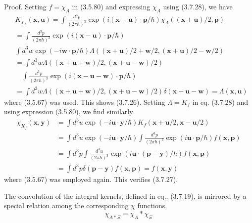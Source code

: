 \documentclass{article}
\begin{document}
Proof. Setting $f=\chi_{A}$ in (3.5.80) and expressing $\chi_{A}$ using (3.7.28), we have
$$
\begin{align*}
& K_{\chi_{\Lambda}}(\boldsymbol{x}, \boldsymbol{u})= \int \frac{d^{3} p}{(2 \pi \hbar)^{3}} \exp (i(\boldsymbol{x}-\boldsymbol{u}) \cdot \boldsymbol{p} / \hbar) \chi_{\Lambda}((\boldsymbol{x}+\boldsymbol{u}) / 2, \boldsymbol{p})  \tag{3.7.29}\\
&= \int \frac{d^{3} p}{(2 \pi \hbar)^{3}} \exp (i(\boldsymbol{x}-\boldsymbol{u}) \cdot \boldsymbol{p} / \hbar) \\
& \int d^{3} w \exp (-i \boldsymbol{w} \cdot \boldsymbol{p} / \hbar) \Lambda((\boldsymbol{x}+\boldsymbol{u}) / 2+\boldsymbol{w} / 2,(\boldsymbol{x}+\boldsymbol{u}) / 2-\boldsymbol{w} / 2) \\
&= \int d^{3} w \Lambda((\boldsymbol{x}+\boldsymbol{u}+\boldsymbol{w}) / 2,(\boldsymbol{x}+\boldsymbol{u}-\boldsymbol{w}) / 2) \\
& \quad \int \frac{d^{3} p}{(2 \pi \hbar)^{3}} \exp (i(\boldsymbol{x}-\boldsymbol{u}-\boldsymbol{w}) \cdot \boldsymbol{p} / \hbar) \\
&= \int d^{3} w \Lambda((\boldsymbol{x}+\boldsymbol{u}+\boldsymbol{w}) / 2,(\boldsymbol{x}+\boldsymbol{u}-\boldsymbol{w}) / 2) \delta(\boldsymbol{x}-\boldsymbol{u}-\boldsymbol{w})=\Lambda(\boldsymbol{x}, \boldsymbol{u})
\end{align*}
$$
where (3.5.67) was used. This shows (3.7.26).
Setting $\Lambda=K_{f}$ in eq. (3.7.28) and using expression (3.5.80), we find similarly
$$
\begin{align*}
\chi_{K_{f}}(\boldsymbol{x}, \boldsymbol{y}) & =\int d^{3} u \exp (-i \boldsymbol{u} \cdot \boldsymbol{y} / \hbar) K_{f}(\boldsymbol{x}+\boldsymbol{u} / 2, \boldsymbol{x}-\boldsymbol{u} / 2)  \tag{3.7.30}\\
& =\int d^{3} u \exp (-i \boldsymbol{u} \cdot \boldsymbol{y} / \hbar) \int \frac{d^{3} p}{(2 \pi \hbar)^{3}} \exp (i \boldsymbol{u} \cdot \boldsymbol{p} / \hbar) f(\boldsymbol{x}, \boldsymbol{p}) \\
& =\int d^{3} p \int \frac{d^{3} u}{(2 \pi \hbar)^{3}} \exp (i \boldsymbol{u} \cdot(\boldsymbol{p}-\boldsymbol{y}) / \hbar) f(\boldsymbol{x}, \boldsymbol{p}) \\
& =\int d^{3} p \delta(\boldsymbol{p}-\boldsymbol{y}) f(\boldsymbol{x}, \boldsymbol{p})=f(\boldsymbol{x}, \boldsymbol{y})
\end{align*}
$$
where (3.5.67) was employed again. This verifies (3.7.27).

The convolution of the integral kernels, defined in eq.. (3.7.19), is mirrored
by a special relation among the corresponding $\chi$ functions,
$$
\begin{equation*}
\chi_{A * \Xi}=\chi_{A} * \chi_{\Xi} \tag{3.7.31}
\end{equation*}
$$
\end{document}
